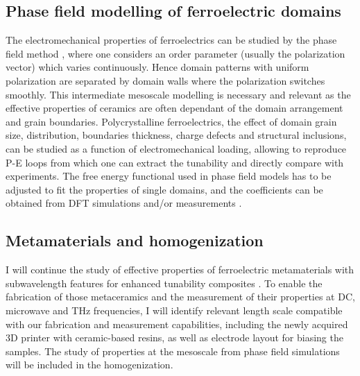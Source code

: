 \documentclass[11pt]{academia}
\begin{document}
\hypertarget{sec:pf}{%
\subsection{Phase field modelling of ferroelectric
domains}\label{sec:pf}}

The electromechanical properties of ferroelectrics can be studied by the
phase field method \autocite{suContinuumThermodynamicsFerroelectric2007},
where one considers an order parameter (usually the polarization vector)
which varies continuously. Hence domain patterns with uniform
polarization are separated by domain walls where the polarization
switches smoothly. This intermediate mesoscale modelling is necessary
and relevant as the effective properties of ceramics are often dependant
of the domain arrangement and grain boundaries. Polycrystalline
ferroelectrics, the effect of domain grain size, distribution,
boundaries thickness, charge defects and structural inclusions, can be
studied as a function of electromechanical loading, allowing to
reproduce P-E loops from which one can extract the tunability and
directly compare with experiments. The free energy functional used in
phase field models has to be adjusted to fit the properties of single
domains, and the coefficients can be obtained from DFT simulations and/or measurements
\autocite{volkerMultiscaleModelingFerroelectric2011}. 


\hypertarget{sec:meta}{%
\subsection{Metamaterials and homogenization}\label{sec:meta}}

I will continue the study of effective properties of ferroelectric
metamaterials with subwavelength features for enhanced tunability
composites \autocite{vialEnhancedTunabilityFerroelectric2019, vialHighFrequencyMetaferroelectrics2021}. 
To enable the fabrication of those metaceramics and the measurement of their
properties at DC, microwave and THz frequencies, I will
identify relevant length scale compatible with our fabrication and
measurement capabilities, including the newly acquired 3D printer 
with ceramic-based resins, as well as electrode layout for biasing the samples.
The study of properties at the mesoscale from phase field simulations
will be included in the homogenization.

\vspace*{1cm}
\end{document}
